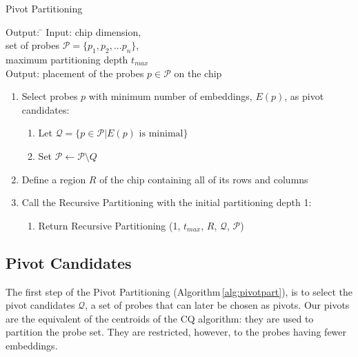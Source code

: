 \documentclass{llncs}
\begin{document}
\begin{algorithm}
\caption{Pivot Partitioning}
\label{alg:pivotpart}
\begin{minipage}{4.8in}

\begin{tabbing}
Output: \=                                  \kill
Input:  \> chip dimension,                          \\
        \> set of probes $\mathcal{P} = \{p_{1}, p_{2}, ... p_{n}\}$,       \\
        \> maximum partitioning depth $t_{max}$                 \\
Output: \> placement of the probes $p \in \mathcal{P}$ on the chip
\end{tabbing}

\begin{enumerate}
\item Select probes $p$ with minimum number of embeddings, $E(p)$,
as pivot candidates:
  \begin{enumerate}
  \item Let $\mathcal{Q} = \{p \in \mathcal{P} | E(p) \mbox{ is minimal}\}$
  \item Set $\mathcal{P} \leftarrow \mathcal{P} \setminus Q$
  \end{enumerate}
\item Define a region $R$ of the chip containing all of its rows and columns
\item Call the Recursive Partitioning with the initial partitioning depth 1:
  \begin{enumerate}
  \item Return Recursive Partitioning (1, $t_{max}$, $R$, $\mathcal{Q}$, $\mathcal{P}$)
  \end{enumerate}
\end{enumerate}

\end{minipage}
\end{algorithm}

\subsection{Pivot Candidates}

The first step of the Pivot Partitioning (Algorithm\,\ref{alg:pivotpart}), is to
select the pivot candidates $\mathcal{Q}$, a set of probes that can later be
chosen as pivots. Our pivots are the equivalent of the centroids of the CQ
algorithm: they are used to partition the probe set. They are restricted,
however, to the probes having fewer embeddings.
\end{document}
